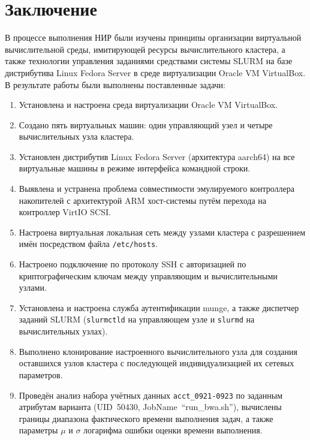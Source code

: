 \newpage
\section*{Заключение}

В процессе выполнения НИР были изучены принципы организации
виртуальной вычислительной среды, имитирующей ресурсы вычислительного
кластера, а также технологии управления заданиями средствами системы
SLURM на базе дистрибутива Linux Fedora Server в среде виртуализации
Oracle VM VirtualBox. В результате работы были выполнены поставленные
задачи:

\begin{enumerate}
\item Установлена и настроена среда виртуализации Oracle VM VirtualBox.

\item Создано пять виртуальных машин: один управляющий узел и четыре
вычислительных узла кластера.

\item Установлен дистрибутив Linux Fedora Server (архитектура aarch64)
на все виртуальные машины в режиме интерфейса командной строки.

\item Выявлена и устранена проблема совместимости эмулируемого
контроллера накопителей с архитектурой ARM хост-системы путём перехода
на контроллер VirtIO SCSI.

\item Настроена виртуальная локальная сеть между узлами кластера с
разрешением имён посредством файла \texttt{/etc/hosts}.

\item Настроено подключение по протоколу SSH с авторизацией по
криптографическим ключам между управляющим и вычислительными узлами.

\item Установлена и настроена служба аутентификации munge, а также
диспетчер заданий SLURM (\texttt{slurmctld} на управляющем узле и
\texttt{slurmd} на вычислительных узлах).

\item Выполнено клонирование настроенного вычислительного узла для
создания оставшихся узлов кластера с последующей индивидуализацией их
сетевых параметров.

\item Проведён анализ набора учётных данных \texttt{acct\_0921-0923}
по заданным атрибутам варианта (UID~50430, JobName~``run\_bwa.sh''),
вычислены границы диапазона фактического времени выполнения задач, а
также параметры $\mu$ и $\sigma$ логарифма ошибки оценки времени
выполнения.


\end{enumerate}
